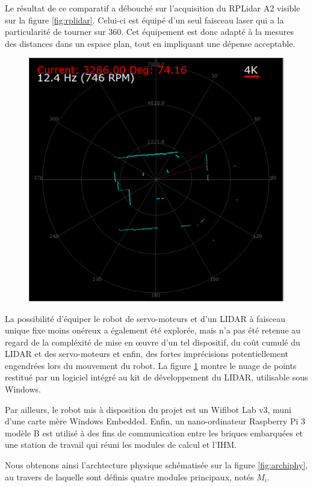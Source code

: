 Le résultat de ce comparatif a débouché sur l'acquisition du RPLidar A2 visible sur la figure \ref{fig:rplidar}.
Celui-ci est équipé d'un seul faisceau laser qui a la particularité de tourner sur 360\degre. 
Cet équipement est donc adapté à la mesures des distances dans un espace plan, tout en impliquant une dépense acceptable. 
\begin{figure}[h]
  \centering
    \includegraphics[width=.5\linewidth]{figures/lidar-points}  
  \label{fig:lidar-points-cloud}
\end{figure}
La possibilité d'équiper le robot de servo-moteurs et d'un LIDAR à faisceau unique fixe moins onéreux a également été explorée, mais n'a pas été retenue au regard de la compléxité de mise en \oe{}uvre d'un tel dispositif, 
du coût cumulé du LIDAR et des servo-moteurs et enfin, des fortes imprécisions potentiellement engendrées lors du mouvement du robot. 
La figure \ref{fig:lidar-points-cloud} montre le nuage de points restitué par un logiciel intégré au kit de développement du LIDAR, utilisable sous Windows.  

Par ailleurs, le robot mis à disposition du projet est un Wifibot Lab v3, muni d'une carte mère Windows Embedded. 
Enfin, un nano-ordinateur Raspberry Pi 3 modèle B est utilisé à des fins de communication entre les briques embarquées et une station de travail qui réuni les modules de calcul et l'\gls{IHM}.

Nous obtenons ainsi l'archtecture physique schématisée sur la figure \ref{fig:archiphy}, au travers de laquelle sont définis quatre modules principaux, notés $M_{i}$.

